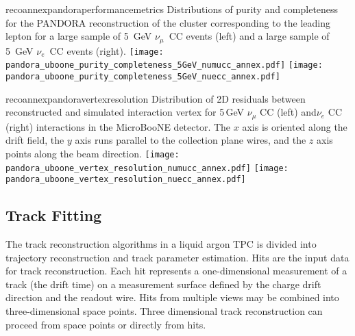 \begin{cdrfigure}{recoannexpandoraperformancemetrics}
{Distributions of purity and completeness for the PANDORA reconstruction of the cluster corresponding
to the leading lepton for a large sample of 5~GeV $\nu_\mu$~CC events (left) and a large sample
of 5~GeV $\nu_e$~CC events (right).}
\texttt{[image: pandora\_uboone\_purity\_completeness\_5GeV\_numucc\_annex.pdf]}
\texttt{[image: pandora\_uboone\_purity\_completeness\_5GeV\_nuecc\_annex.pdf]}
\end{cdrfigure}

\begin{cdrfigure}{recoannexpandoravertexresolution}
{Distribution of 2D residuals between reconstructed and simulated interaction
 vertex for 5\,GeV $\nu_{\mu}$ CC (left) and$\nu_{e}$ CC (right) interactions in the MicroBooNE detector.
 The $x$ axis is oriented along the drift field, the $y$ axis runs parallel 
 to the collection plane wires, and the $z$ axis points along the beam direction.}
\texttt{[image: pandora\_uboone\_vertex\_resolution\_numucc\_annex.pdf]}
\texttt{[image: pandora\_uboone\_vertex\_resolution\_nuecc\_annex.pdf]}
\end{cdrfigure}


\subsection{Track Fitting}

The track reconstruction algorithms in a liquid argon TPC is divided
into trajectory reconstruction and track parameter estimation.
Hits are the input data for track reconstruction.  Each hit represents a
one-dimensional measurement of a track (the drift time) on a
measurement surface defined by the charge drift direction and the
readout wire.  Hits from multiple views may be combined into
three-dimensional space points. Three dimensional track reconstruction
can proceed from space points or directly from hits.

